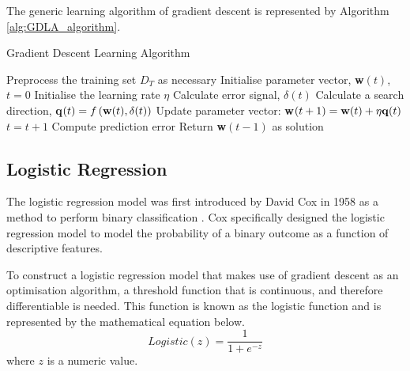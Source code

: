 \documentclass[10pt, conference]{IEEEtran}
\begin{document}
The generic learning algorithm of gradient descent is represented by Algorithm \ref{alg:GDLA_algorithm}.
\begin{algorithm}[H]
    \caption{Gradient Descent Learning Algorithm}
    \label{alg:GDLA_algorithm}
    \begin{algorithmic}[1]
        \State Preprocess the training set $D_T$ as necessary
        \State Initialise parameter vector, \textbf{w}$(t)$, $t=0$
        \State Initialise the learning rate $\eta$
                \State Calculate error signal, $\delta(t)$
                \State Calculate a search direction, \textbf{q}$(t) = f\left( \text{\textbf{w}}(t), \delta(t) \right)$
                \State Update parameter vector: \textbf{w}$(t+1) = \text{\textbf{w}}(t) + \eta \text{\textbf{q}}(t)$
            \EndFor
            \State $t = t + 1$
            \State Compute prediction error
        \EndWhile
        \State Return \textbf{w}$(t-1)$ as solution
    \end{algorithmic}
\end{algorithm}

\subsection{Logistic Regression} \label{section: logistic_regression_background}

The logistic regression model was first introduced by David Cox in 1958 as a method to perform binary
classification \cite{logistic_regression_ref}. Cox specifically designed the logistic regression
model to model the probability of a binary outcome as a function of descriptive features.

To construct a logistic regression model that makes use of gradient descent as an optimisation
algorithm, a threshold function that is continuous, and therefore differentiable is needed. This function
is known as the logistic function and is represented by the mathematical equation below.
\begin{equation}
    Logistic(z) = \frac{1}{1 + e^{-z}} \label{eq: logistic_function}
\end{equation}
where $z$ is a numeric value.
\end{document}
